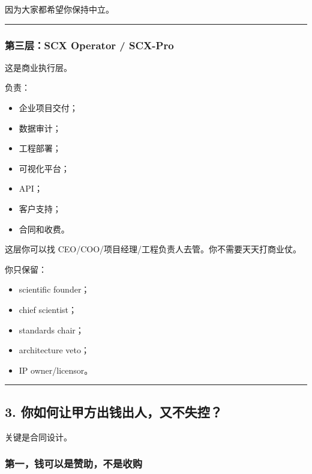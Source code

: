 \documentclass[
  12pt,
]{ctexart}
\providecommand{\tightlist}{%
  \setlength{\itemsep}{0pt}\setlength{\parskip}{0pt}}
\begin{document}
因为大家都希望你保持中立。

\begin{center}\rule{0.5\linewidth}{0.5pt}\end{center}

\subsubsection{第三层：SCX Operator /
SCX-Pro}\label{ux7b2cux4e09ux5c42scx-operator-scx-pro}

这是商业执行层。

负责：

\begin{itemize}
\tightlist
\item
  企业项目交付；
\item
  数据审计；
\item
  工程部署；
\item
  可视化平台；
\item
  API；
\item
  客户支持；
\item
  合同和收费。
\end{itemize}

这层你可以找 CEO/COO/项目经理/工程负责人去管。你不需要天天打商业仗。

你只保留：

\begin{itemize}
\tightlist
\item
  scientific founder；
\item
  chief scientist；
\item
  standards chair；
\item
  architecture veto；
\item
  IP owner/licensor。
\end{itemize}

\begin{center}\rule{0.5\linewidth}{0.5pt}\end{center}

\subsection{3.
你如何让甲方出钱出人，又不失控？}\label{ux4f60ux5982ux4f55ux8ba9ux7532ux65b9ux51faux94b1ux51faux4ebaux53c8ux4e0dux5931ux63a7}

关键是合同设计。

\subsubsection{第一，钱可以是赞助，不是收购}\label{ux7b2cux4e00ux94b1ux53efux4ee5ux662fux8d5eux52a9ux4e0dux662fux6536ux8d2d}
\end{document}
